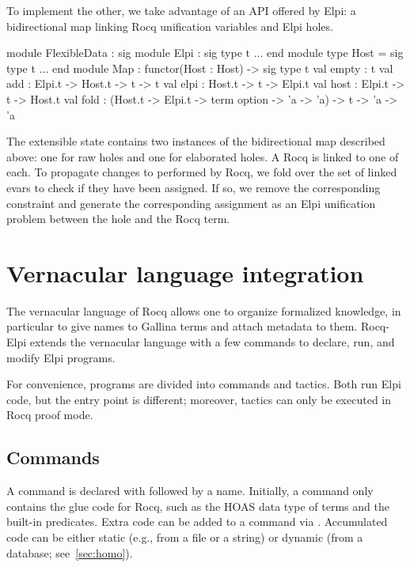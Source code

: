 \documentclass{these-ISSS}
\newenvironment{ocamlcode}
  {\VerbatimEnvironment\begin{ocamlbox}\begin{xocamlcode}}{\end{xocamlcode}
\end{ocamlbox}}
\begin{document}
To implement the other, we take advantage of an API offered by Elpi: a
bidirectional map linking Rocq unification variables and Elpi holes.

\begin{ocamlcode}
module FlexibleData : sig
  module Elpi : sig type t ... end
  module type Host = sig type t ... end
  module Map : functor(Host : Host) -> sig
    type t
    val empty : t
    val add   : Elpi.t -> Host.t -> t -> t
    val elpi  : Host.t -> t -> Elpi.t
    val host  : Elpi.t -> t -> Host.t
    val fold  :
      (Host.t -> Elpi.t -> term option -> 'a -> 'a) -> t -> 'a -> 'a
\end{ocamlcode}

\noindent
The extensible state contains two instances of the bidirectional map
described above: one for raw holes and one for elaborated holes. A Rocq
 is linked to one of each.
To propagate changes to  performed by Rocq, we fold
over the set of linked evars to check if they have been assigned. If so, we
remove the corresponding  constraint and generate the corresponding
assignment as an Elpi unification problem between the hole and the Rocq term.



\section{Vernacular language integration}


The vernacular language of Rocq allows one to organize formalized knowledge,
in particular to give names to Gallina terms and attach metadata to them.
Rocq-Elpi extends the vernacular language with a few commands to declare, run,
and modify Elpi programs.

For convenience, programs are divided into commands and tactics. Both run Elpi
code, but the entry point is different; moreover, tactics can only be executed
in Rocq proof mode.

\subsection{Commands}

A command is declared with  followed by a name. Initially,
a command only contains the glue code for Rocq, such as the HOAS data type of
terms and the built-in predicates. Extra code can be added to a command via
. Accumulated code can be either static (e.g., from a
file or a string) or dynamic (from a database; see~\cref{sec:homo}).
\end{document}
